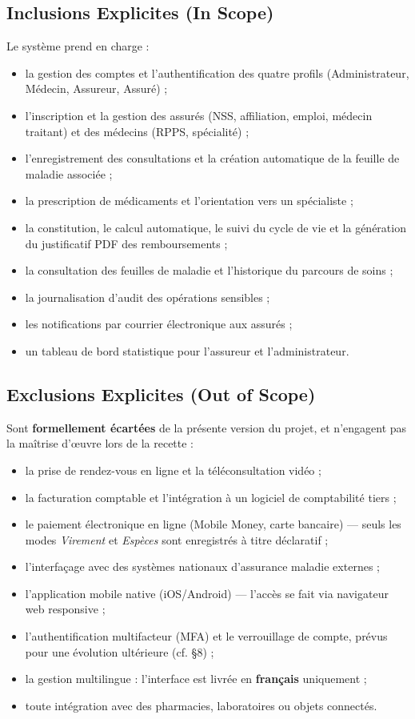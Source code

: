\documentclass[11pt,a4paper]{article}
\begin{document}
\subsection{Inclusions Explicites (In Scope)}
Le système prend en charge :
\begin{itemize}[leftmargin=1.4em]
  \item la gestion des comptes et l'authentification des quatre profils
  (Administrateur, Médecin, Assureur, Assuré) ;
  \item l'inscription et la gestion des assurés (NSS, affiliation, emploi,
  médecin traitant) et des médecins (RPPS, spécialité) ;
  \item l'enregistrement des consultations et la création automatique de la
  feuille de maladie associée ;
  \item la prescription de médicaments et l'orientation vers un spécialiste ;
  \item la constitution, le calcul automatique, le suivi du cycle de vie et la
  génération du justificatif PDF des remboursements ;
  \item la consultation des feuilles de maladie et l'historique du parcours de soins ;
  \item la journalisation d'audit des opérations sensibles ;
  \item les notifications par courrier électronique aux assurés ;
  \item un tableau de bord statistique pour l'assureur et l'administrateur.
\end{itemize}

\subsection{Exclusions Explicites (Out of Scope)}
Sont \textbf{formellement écartées} de la présente version du projet, et n'engagent
pas la maîtrise d'œuvre lors de la recette :
\begin{itemize}[leftmargin=1.4em]
  \item la prise de rendez-vous en ligne et la téléconsultation vidéo ;
  \item la facturation comptable et l'intégration à un logiciel de comptabilité tiers ;
  \item le paiement électronique en ligne (Mobile Money, carte bancaire) — seuls
  les modes \emph{Virement} et \emph{Espèces} sont enregistrés à titre déclaratif ;
  \item l'interfaçage avec des systèmes nationaux d'assurance maladie externes ;
  \item l'application mobile native (iOS/Android) — l'accès se fait via navigateur
  web responsive ;
  \item l'authentification multifacteur (MFA) et le verrouillage de compte, prévus
  pour une évolution ultérieure (cf. §8) ;
  \item la gestion multilingue : l'interface est livrée en \textbf{français} uniquement ;
  \item toute intégration avec des pharmacies, laboratoires ou objets connectés.
\end{itemize}
\end{document}
